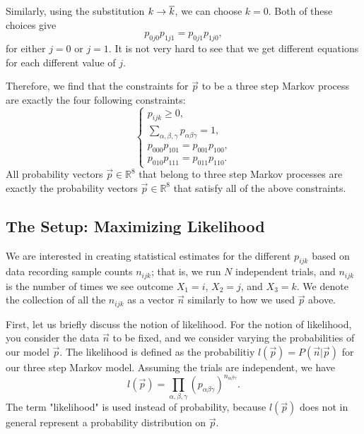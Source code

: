 Similarly, using the substitution \(k \to \overline{k}\), we can choose \(k = 0\). Both of these choices give
\begin{equation}
p_{0j0} p_{1j1} = p_{0j1} p_{1j0},
\end{equation}
for either \(j = 0\) or \(j = 1\). It is not very hard to see that we get different equations for each
different value of \(j\). 

Therefore, we find that the constraints for \(\vec p\) to be a three step Markov process are exactly the
four following constraints: 
\begin{equation}
\begin{cases}
p_{ijk} \geq 0, \\
\sum_{\alpha, \beta, \gamma} p_{\alpha\beta\gamma} = 1, \\
p_{000} p_{101} = p_{001} p_{100}, \\ 
p_{010} p_{111} = p_{011} p_{110}.
\end{cases}
\end{equation}
All probability vectors \(\vec p \in \mathbb R^8\) that belong to three step Markov processes are exactly 
the probability vectors \(\vec p\in \mathbb R^8\) that satisfy all of the above constraints. 

\subsection*{The Setup: Maximizing Likelihood}

We are interested in creating statistical estimates for the different \(p_{ijk}\) based on data recording
sample counts \(n_{ijk}\); that is, we run \(N\) independent trials, and \(n_{ijk}\) is the 
number of times we see outcome \(X_1 = i\), \(X_2 = j\), and \(X_3 = k\). We denote the collection of
all the \(n_{ijk}\) as a vector \(\vec n\) similarly to how we used \(\vec p\) above. 

First, let us briefly discuss the notion of likelihood. For the notion of likelihood, you consider the
data \(\vec n\) to be fixed, and we consider varying the probabilities of our model \(\vec p\). The 
likelihood is defined as the probabilitiy \(l(\vec p) = P(\vec n | \vec p) \) for our three step Markov
model. Assuming the trials are independent, we have
\begin{equation}
l(\vec p) = \prod_{\alpha, \beta, \gamma} (p_{\alpha\beta\gamma})^{n_{\alpha\beta\gamma}}.
\end{equation} 
The term "likelihood" is used instead of probability, because \(l(\vec p)\) does not in general represent
a probability distribution on \(\vec p\).

